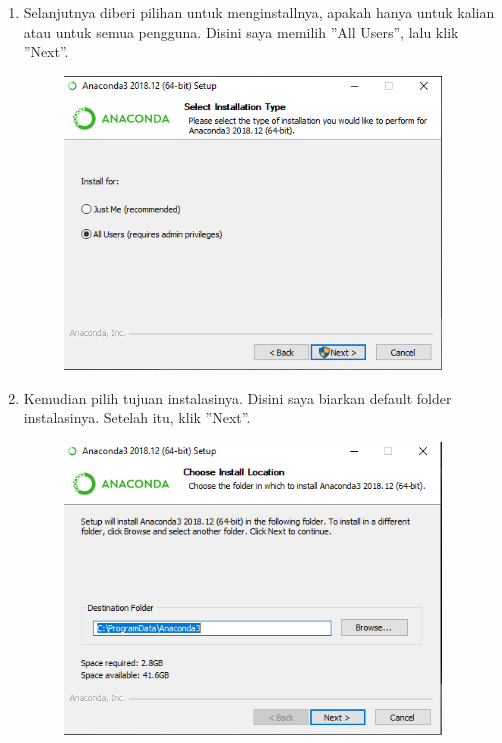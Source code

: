\begin{enumerate}
	\item Selanjutnya diberi pilihan untuk menginstallnya, apakah hanya untuk kalian atau untuk semua pengguna. Disini saya memilih ''All Users'', lalu klik ''Next''.
	\begin{figure}[H]
		\includegraphics[width=10cm]{figures/diva/3chp1diva.png}
		\centering
	\end{figure}

	\item Kemudian pilih tujuan instalasinya. Disini saya biarkan default folder instalasinya. Setelah itu, klik ''Next''.
	\begin{figure}[H]
		\includegraphics[width=10cm]{figures/diva/4chp1diva.png}
		\centering
	\end{figure}


\end{enumerate}
